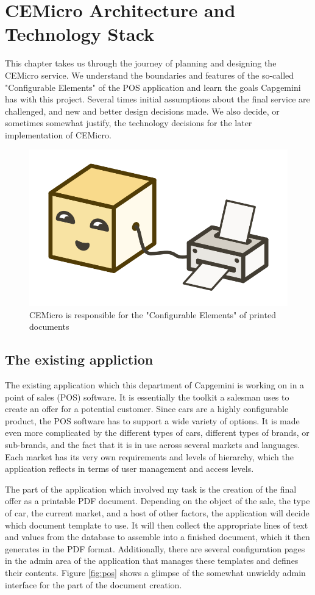 \chapter{CEMicro Architecture and Technology Stack}
\label{sec:arch}

This chapter takes us through the journey of planning and designing the CEMicro service. We understand the boundaries and features of the so-called "Configurable Elements" of the POS application and learn the goals Capgemini has with this project. Several times initial assumptions about the final service are challenged, and new and better design decisions made. We also decide, or sometimes somewhat justify, the technology decisions for the later implementation of CEMicro.

\begin{figure}[ht]
  \centering
  \includegraphics[width=0.4\linewidth]{assets/illustration-microservice-printer.png}
  \caption{CEMicro is responsible for the "Configurable Elements" of printed documents}
\end{figure}

\section{The existing appliction}

The existing application which this department of Capgemini is working on in a point of sales (POS) software. It is essentially the toolkit a salesman uses to create an offer for a potential customer. Since cars are a highly configurable product, the POS software has to support a wide variety of options. It is made even more complicated by the different types of cars, different types of brands, or sub-brands, and the fact that it is in use across several markets and languages. Each market has its very own requirements and levels of hierarchy, which the application reflects in terms of user management and access levels.

The part of the application which involved my task is the creation of the final offer as a printable PDF document. Depending on the object of the sale, the type of car, the current market, and a host of other factors, the application will decide which document template to use. It will then collect the appropriate lines of text and values from the database to assemble into a finished document, which it then generates in the PDF format. Additionally, there are several configuration pages in the admin area of the application that manages these templates and defines their contents. Figure \ref{fig:pos} shows a glimpse of the somewhat unwieldy admin interface for the part of the document creation.

